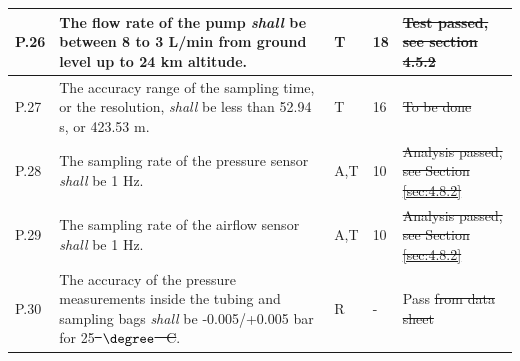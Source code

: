 \documentclass[a4paper,12pt,oneside]{article} %
\providecommand{\DIFaddtex}[1]{{\protect\color{blue}\uwave{#1}}} %
\providecommand{\DIFdeltex}[1]{{\protect\color{red}\sout{#1}}}                      %
\providecommand{\DIFaddbegin}{} %
\providecommand{\DIFaddend}{} %
\providecommand{\DIFdelbegin}{} %
\providecommand{\DIFdelend}{} %
\providecommand{\DIFadd}[1]{\texorpdfstring{\DIFaddtex{#1}}{#1}} %
\providecommand{\DIFdel}[1]{\texorpdfstring{\DIFdeltex{#1}}{}} %
\newcommand{\DIFscaledelfig}{0.5}
\newlength{\DIFdelgraphicswidth} %
\newlength{\DIFdelgraphicsheight} %
\newcommand{\DIFaddincludegraphics}[2][]{{\color{blue}\fbox{\DIFOincludegraphics[#1]{#2}}}} %
\newcommand{\DIFdelincludegraphics}[2][]{%
\sbox{\DIFdelgraphicsbox}{\DIFOincludegraphics[#1]{#2}}%
\settoboxwidth{\DIFdelgraphicswidth}{\DIFdelgraphicsbox} %
\settoboxtotalheight{\DIFdelgraphicsheight}{\DIFdelgraphicsbox} %
\scalebox{\DIFscaledelfig}{%
\parbox[b]{\DIFdelgraphicswidth}{\usebox{\DIFdelgraphicsbox}\\[-\baselineskip] \rule{\DIFdelgraphicswidth}{0em}}\llap{\resizebox{\DIFdelgraphicswidth}{\DIFdelgraphicsheight}{%
\setlength{\unitlength}{\DIFdelgraphicswidth}%
\begin{picture}(1,1)%
\thicklines\linethickness{2pt} %
{\color[rgb]{1,0,0}\put(0,0){\framebox(1,1){}}}%
{\color[rgb]{1,0,0}\put(0,0){\line( 1,1){1}}}%
{\color[rgb]{1,0,0}\put(0,1){\line(1,-1){1}}}%
\end{picture}%
}\hspace*{3pt}}} %
} %
\DeclareRobustCommand{\DIFaddbegin}{\DIFOaddbegin \let\includegraphics\DIFaddincludegraphics} %
\DeclareRobustCommand{\DIFaddend}{\DIFOaddend \let\includegraphics\DIFOincludegraphics} %
\DeclareRobustCommand{\DIFdelbegin}{\DIFOdelbegin \let\includegraphics\DIFdelincludegraphics} %
\DeclareRobustCommand{\DIFdelend}{\DIFOaddend \let\includegraphics\DIFOincludegraphics} %
\begin{document}
\begin{longtable}[]{|m{}| m{} |m{} |m{}|m{}|}
P.26 & The \DIFaddbegin \DIFadd{equivalent }\DIFaddend flow rate of the pump \textit{shall} be between 8 to 3 L/min from ground level up to 24 km altitude. & T & 18 & \DIFdelbegin \DIFdel{Test passed, see section 4.5.2 }\DIFdelend \DIFaddbegin \DIFadd{Pass }\DIFaddend \\ \hline

P.27 &  The accuracy range of the sampling time, or the resolution, \textit{shall} be less than 52.94 s, or 423.53 m. & T & 16 & \DIFdelbegin \DIFdel{To be done }\DIFdelend \DIFaddbegin \DIFadd{Pass }\DIFaddend \\ \hline
P.28 & The sampling rate of the pressure sensor \textit{shall} be 1 Hz.                                                                                    &         A,T     & 10            &  \DIFdelbegin \DIFdel{Analysis passed, see Section \ref{sec:4.8.2}      }\DIFdelend \DIFaddbegin \DIFadd{Pass }\DIFaddend \\ \hline
P.29 & The sampling rate of the airflow sensor \textit{shall} be 1 Hz.                                                                                    &         A,T     & 10            & \DIFdelbegin \DIFdel{Analysis passed, see Section \ref{sec:4.8.2}      }\DIFdelend \DIFaddbegin \DIFadd{Pass  }\DIFaddend \\ \hline
P.30 & The accuracy of the pressure measurements inside the tubing and sampling bags \textit{shall} be -0.005/+0.005 bar for 25\DIFdelbegin \DIFdel{\mbox{%
$\degree$
}%
C}\DIFdelend \DIFaddbegin \DIFadd{\mbox{%
$\degree{C}$
}%
}\DIFaddend .                                                                              &        R      &  -          & Pass     \DIFdelbegin \DIFdel{from data sheet       }\DIFdelend \\ \hline %


\end{longtable}
\end{document}
